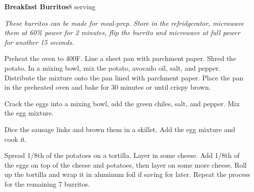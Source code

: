 \documentclass[../recipe-collections/cooking.tex]{subfiles}
\begin{document}
\begin{recipe}{\textbf{Breakfast Burritos}}{8 serving}{}

  \freeform{}\textit{These burritos can be made for meal-prep. Store in the refridgerator,
  microwave them at 60\% power for 2 minutes, flip the burrito and microwave at full power
  for another 15 seconds.}


  Preheat the oven to 400F. Line a sheet pan with parchment paper. 
  Shred the potato. In a mixing bowl, mix the potato, avocado oil, salt, and
  pepper. Distribute the mixture onto the pan lined with parchment paper. Place 
  the pan in the preheated oven and bake for 30 minutes or until crispy brown.


  Crack the eggs into a mixing bowl, add the green chiles, salt, and pepper. Mix 
  the egg mixture.


  Dice the sausage links and brown them in a skillet. Add the egg mixture and cook
  it. 
  

  Spread 1/8th of the potatoes on a tortilla. Layer in some cheese. Add 1/8th of 
  the eggs on top of the cheese and potatoes, then layer on some more cheese. 
  Roll up the tortilla and wrap it in aluminum foil if saving for later. Repeat
  the process for the remaining 7 burritos.


\end{recipe}
\end{document}
